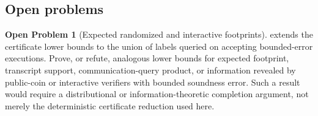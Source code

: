 \documentclass[11pt]{article}
\theoremstyle{definition}
\newtheorem{openproblem}[theorem]{Open Problem}
\begin{document}
\subsection{Open problems}

\begin{openproblem}[Expected randomized and interactive footprints]\label{op:randomized}
 extends the certificate lower bounds to the union of labels queried on accepting bounded-error executions.  Prove, or refute, analogous lower bounds for expected footprint, transcript support, communication-query product, or information revealed by public-coin or interactive verifiers with bounded soundness error.  Such a result would require a distributional or information-theoretic completion argument, not merely the deterministic certificate reduction used here.
\end{openproblem}
\end{document}
